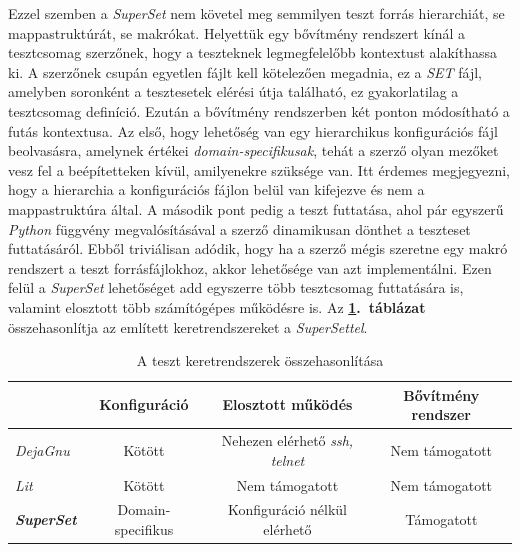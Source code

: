     Ezzel szemben a \textit{SuperSet} nem követel meg semmilyen teszt forrás hierarchiát, se mappastruktúrát, se
    makrókat. Helyettük egy bővítmény rendszert kínál a tesztcsomag szerzőnek, hogy a teszteknek legmegfelelőbb
    kontextust alakíthassa ki. A szerzőnek csupán egyetlen fájlt kell kötelezően megadnia, ez a \textit{SET} fájl,
    amelyben soronként a tesztesetek elérési útja található, ez gyakorlatilag a tesztcsomag definíció. Ezután a
    bővítmény rendszerben két ponton módosítható a futás kontextusa. Az első, hogy lehetőség van egy hierarchikus
    konfigurációs fájl beolvasásra, amelynek értékei \emph{domain-specifikusak}, tehát a szerző olyan mezőket vesz fel
    a beépítetteken kívül, amilyenekre szüksége van. Itt érdemes megjegyezni, hogy a hierarchia a konfigurációs fájlon
    belül van kifejezve és nem a mappastruktúra által. A második pont pedig a teszt futtatása, ahol pár egyszerű
    \textit{Python} függvény megvalósításával a szerző dinamikusan dönthet a teszteset futtatásáról. Ebből triviálisan
    adódik, hogy ha a szerző mégis szeretne egy makró rendszert a teszt forrásfájlokhoz, akkor lehetősége van azt
    implementálni. Ezen felül a \textit{SuperSet} lehetőséget add egyszerre több tesztcsomag futtatására is, valamint
    elosztott több számítógépes működésre is. Az \textbf{\ref{fig:chp1-comparison}.\ táblázat} összehasonlítja az
    említett keretrendszereket a \textit{SuperSettel}.

    \begin{table}[ht]
        \centering
        \begin{tabular}{lccc}
            \toprule
                                       & Konfiguráció      & Elosztott működés                     & Bővítmény rendszer \\
            \midrule
            \textit{DejaGnu}           & Kötött            & Nehezen elérhető \textit{ssh, telnet} & Nem támogatott     \\
            \textit{Lit}               & Kötött            & Nem támogatott                        & Nem támogatott     \\
            \textit{\textbf{SuperSet}} & Domain-specifikus & Konfiguráció nélkül elérhető          & Támogatott         \\
            \bottomrule
        \end{tabular}
        \caption{\label{fig:chp1-comparison} A teszt keretrendszerek összehasonlítása}
    \end{table}

